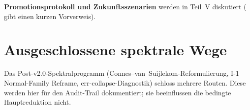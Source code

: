 \documentclass[12pt,a4paper]{article}
\theoremstyle{definition}
\theoremstyle{remark}
\begin{document}
\noindent\textbf{Promotionsprotokoll und Zukunftsszenarien} werden in
Teil~V diskutiert ( gibt einen kurzen Vorverweis).


\section{Ausgeschlossene spektrale Wege}
\label{sec:excluded-spectral}

Das Post-v2.0-Spektralprogramm (Connes--van~Suijlekom-Reformulierung,
I-1 Normal-Family Reframe, err-collapse-Diagnostik) schloss mehrere
Routen. Diese werden hier für den Audit-Trail dokumentiert; sie
beeinflussen die bedingte Hauptreduktion nicht.
\end{document}
